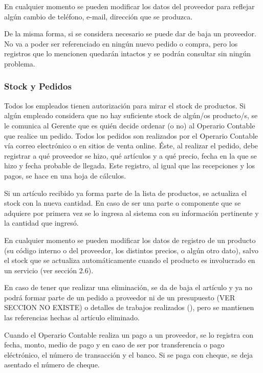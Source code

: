 \documentclass[12pt]{extarticle}
\begin{document}
\begin{spacing}{1.2}
    En cualquier momento se pueden modificar los datos del proveedor para reflejar algún cambio de teléfono, e-mail, dirección que se produzca.

    De la misma forma, si se considera necesario se puede dar de baja un proveedor. No va a poder ser referenciado en ningún nuevo pedido o compra, pero los registros que lo mencionen quedarán intactos y se podrán consultar sin ningún problema.
    
    

    \subsubsection{Stock y Pedidos}

	Todos los empleados tienen autorización para mirar el stock de productos. Si algún empleado considera que no hay suficiente stock de algún/os producto/s, se le comunica al Gerente que es quién decide ordenar (o no) al Operario Contable que realice un pedido. Todos los pedidos son realizados por el Operario Contable vía correo electrónico o en sitios de venta online. Éste, al realizar el pedido, debe registrar a qué proveedor se hizo, qué artículos y a qué precio, fecha en la que se hizo y fecha probable de llegada. Este registro, al igual que las recepciones y los pagos, se hace en una hoja de cálculos.

    Si un artículo recibido ya forma parte de la lista de productos, se actualiza el stock con la nueva cantidad. En caso de ser una parte o componente que se adquiere por primera vez se lo ingresa al sistema con su información pertinente y la cantidad que ingresó. 
        
    En cualquier momento se pueden modificar los datos de registro de un producto (su código interno o del proveedor, los distintos precios, o algún otro dato), salvo el stock que se actualiza automáticamente cuando el producto es involucrado en un servicio (ver sección 2.6). 

    En caso de tener que realizar una eliminación, se da de baja el artículo y ya no podrá formar parte de un pedido a proveedor ni de un presupuesto (VER SECCION NO EXISTE) o detalles de trabajos realizados (), pero se mantienen las referencias hechas al artículo eliminado.

    Cuando el Operario Contable realiza un pago a un proveedor, se lo registra con fecha, monto, medio de pago y en caso de ser por transferencia o pago eléctrónico, el número de transacción y el banco. Si se paga con cheque, se deja asentado el número de cheque.


\end{spacing}
\end{document}
